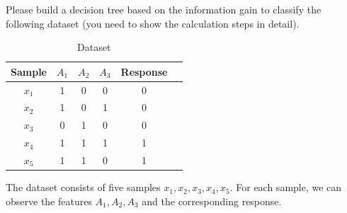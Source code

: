 \documentclass[11pt,letter,notitlepage]{article}
\begin{document}
\begin{exercise}
	Please build a decision tree based on the information gain to classify the following dataset (you need to show the calculation steps in detail).
\end{exercise}
\begin{table}[h]
	\centering
	\begin{tabular}{|c|c|c|c|c|c|}
		\hline
		Sample & $A_1$ & $A_2$ & $A_3$ & Response \\
		\hline
		$x_1$  & 1     & 0     & 0     & 0        \\
		$x_2$  & 1     & 0     & 1     & 0        \\
		$x_3$  & 0     & 1     & 0     & 0        \\
		$x_4$  & 1     & 1     & 1     & 1        \\
		$x_5$  & 1     & 1     & 0     & 1        \\
		\hline
	\end{tabular}
	\caption{Dataset} \label{tab:sample}
	{\raggedright The dataset consists of five samples $x_1,x_2,x_3,x_4,x_5$. For each sample, we can observe the features $A_1,A_2,A_3$ and the corresponding response. \par}
\end{table}
\end{document}
